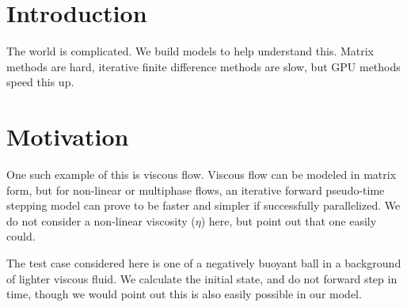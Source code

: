 

\myfont %
\section*{\myfont Introduction} %
The world is complicated. We build models to help understand this. Matrix methods are hard, iterative finite difference methods are slow, but GPU methods speed this up.
\section*{\myfont Motivation} %

One such example of this is viscous flow. Viscous flow can be modeled in matrix form, but for non-linear or multiphase flows, an iterative forward pseudo-time stepping model can prove to be faster and simpler if successfully parallelized. We do not consider a non-linear viscosity ($\eta$) here, but point out that one easily could.

The test case considered here is one of a negatively buoyant ball in a background of lighter viscous fluid. We calculate the initial state, and do not forward step in time, though we would point out this is also easily possible in our model. 
